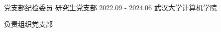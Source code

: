 

\begin{cventries}

  \cventry
    {党支部纪检委员} %
    {研究生党支部} %
    {2022.09 - 2024.06} %
    {武汉大学计算机学院} %
    {
      \begin{cvitems} %
        \item {负责组织党支部}
      \end{cvitems}
    }

\end{cventries}
